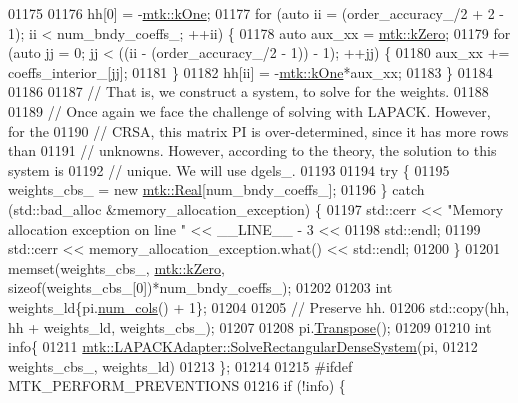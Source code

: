 \begin{DoxyCode}
{{01175 
01176   hh[0] = -\hyperlink{group__c01-roots_ga26407c24d43b6b95480943340d285c71}{mtk::kOne};
01177   \textcolor{keywordflow}{for} (\textcolor{keyword}{auto} ii = (order\_accuracy\_/2 + 2 - 1); ii < num\_bndy\_coeffs\_; ++ii) \{
01178     \textcolor{keyword}{auto} aux\_xx = \hyperlink{group__c01-roots_ga59a451a5fae30d59649bcda274fea271}{mtk::kZero};
01179     \textcolor{keywordflow}{for} (\textcolor{keyword}{auto} jj = 0; jj < ((ii - (order\_accuracy\_/2 - 1)) - 1); ++jj) \{
01180       aux\_xx += coeffs\_interior\_[jj];
01181     \}
01182     hh[ii] = -\hyperlink{group__c01-roots_ga26407c24d43b6b95480943340d285c71}{mtk::kOne}*aux\_xx;
01183   \}
01184 
01186 
01187   \textcolor{comment}{// That is, we construct a system, to solve for the weights.}
01188 
01189   \textcolor{comment}{// Once again we face the challenge of solving with LAPACK. However, for the}
01190   \textcolor{comment}{// CRSA, this matrix PI is over-determined, since it has more rows than}
01191   \textcolor{comment}{// unknowns. However, according to the theory, the solution to this system is}
01192   \textcolor{comment}{// unique. We will use dgels\_.}
01193 
01194   \textcolor{keywordflow}{try} \{
01195     weights\_cbs\_ = \textcolor{keyword}{new} \hyperlink{group__c01-roots_gac080bbbf5cbb5502c9f00405f894857d}{mtk::Real}[num\_bndy\_coeffs\_];
01196   \} \textcolor{keywordflow}{catch} (std::bad\_alloc &memory\_allocation\_exception) \{
01197     std::cerr << \textcolor{stringliteral}{"Memory allocation exception on line "} << \_\_LINE\_\_ - 3 <<
01198       std::endl;
01199     std::cerr << memory\_allocation\_exception.what() << std::endl;
01200   \}
01201   memset(weights\_cbs\_, \hyperlink{group__c01-roots_ga59a451a5fae30d59649bcda274fea271}{mtk::kZero}, \textcolor{keyword}{sizeof}(weights\_cbs\_[0])*num\_bndy\_coeffs\_);
01202 
01203   \textcolor{keywordtype}{int} weights\_ld\{pi.\hyperlink{classmtk_1_1DenseMatrix_a41747502d468c6728a4be31501b16e0e}{num\_cols}() + 1\};
01204 
01205   \textcolor{comment}{// Preserve hh.}
01206   std::copy(hh, hh + weights\_ld, weights\_cbs\_);
01207 
01208   pi.\hyperlink{classmtk_1_1DenseMatrix_a71d9c07ca66e88d97d1fd5012f43138b}{Transpose}();
01209 
01210   \textcolor{keywordtype}{int} info\{
01211     \hyperlink{classmtk_1_1LAPACKAdapter_a380f148ffdf96bae2f79ae28f1a6560c}{mtk::LAPACKAdapter::SolveRectangularDenseSystem}(pi,
01212                                                     weights\_cbs\_, weights\_ld)
01213   \};
01214 
01215 \textcolor{preprocessor}{  #ifdef MTK\_PERFORM\_PREVENTIONS}
01216   \textcolor{keywordflow}{if} (!info) \{
}}
\end{DoxyCode}

